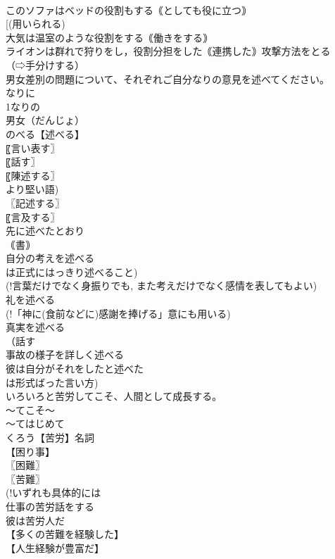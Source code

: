 \documentclass[8pt]{extreport}
\begin{document}
\begin{CJK}{UTF8}{min}
\\	このソファはベッドの役割もする｟としても役に立つ｠
\\	[(用いられる) 
\\	大気は温室のような役割をする｟働きをする｠
\\	ライオンは群れで狩りをし，役割分担をした｟連携した｠攻撃方法をとる
\\	（⇨手分けする）
\\	男女差別の問題について、それぞれご自分なりの意見を述べてください。		
\\	なりに
\\	1なりの
\\	男女（だんじょ）
\\	のべる【述べる】
\\	〖言い表す〗
\\	〖話す〗
\\	〖陳述する〗
\\	より堅い語) 
\\	〖記述する〗
\\	〖言及する〗
\\	先に述べたとおり
\\	｟書｠
\\	自分の考えを述べる
\\	は正式にはっきり述べること) 
\\	(!言葉だけでなく身振りでも, また考えだけでなく感情を表してもよい) 
\\	礼を述べる
\\	(!「神に(食前などに)感謝を捧げる」意にも用いる) 
\\	真実を述べる
\\	（話す
\\	事故の様子を詳しく述べる
\\	彼は自分がそれをしたと述べた
\\	は形式ばった言い方)
\\	いろいろと苦労してこそ、人間として成長する。		
\\	〜てこそ〜　
\\	〜てはじめて 
\\	くろう【苦労】名詞
\\	【困り事】
\\	〖困難〗
\\	〖苦難〗
\\	(!いずれも具体的には 
\\	仕事の苦労話をする
\\	彼は苦労人だ
\\	【多くの苦難を経験した】
\\	【人生経験が豊富だ】

\end{CJK}
\end{document}
